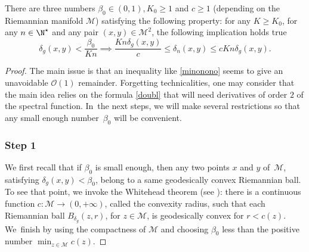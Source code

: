 \begin{prop}\label{mino2}
There are three numbers $\beta_0\in (0,1), K_0\geq 1$ and $c\geq 1$ (depending on the Riemannian manifold $\mathcal{M}$) satisfying the following property: for any $K\geq K_0$, for any $n\in \N^\star$ and any pair $(x,y)\in \mathcal{M}^2$, the following implication holds true\vspace*{-3pt}
\begin{equation*}
\delta_g(x,y)<\frac{\beta_0}{Kn} \implies \frac{K n\delta_g(x,y)}{c}\leq \delta_n(x,y)\leq cKn\delta_g(x,y).
\end{equation*}
\end{prop}
\begin{proof}
The main issue is that an inequality like \eqref{minonono} seems to give an unavoidable $\mathcal{O}(1)$ remainder. Forgetting technicalities, one may consider that the main idea relies on the formula \eqref{doubl} that will need derivatives of order $2$ of the spectral function.
In~the next steps, we will make several restrictions so that any small enough number~$\beta_0$ will be convenient.\vspace*{-3pt}\mbox{}

\subsubsection*{Step 1}
We first recall that if $\beta_0$ is small enough, then any two points $x$ and $y$ of~$\mathcal{M}$, satisfying $\delta_g(x,y)< \beta_0$, belong to a same geodesically convex Riemannian ball.
To see that point, we invoke the Whitehead theorem (see \cite[Th.\,5.14]{cheeger}):
there is a continuous function $c:\mathcal{M}\to (0,+\infty)$, called the convexity radius, such that each Riemannian ball $B_{\delta_g}(z,r)$, for $z\in \mathcal{M}$, is geodesically convex for $r<c(z)$.
We~finish by using the compactness of $\mathcal{M}$ and choosing $\beta_0$ less than the positive number $\min_{z\in \mathcal{M}}c(z)$.\vspace*{-3pt}\mbox{}


\end{proof}
